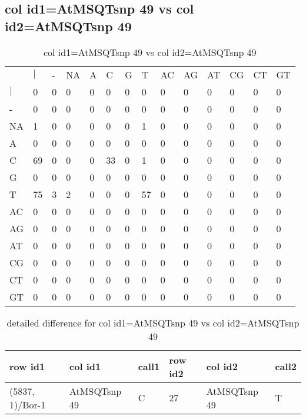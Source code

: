 \subsection{col id1=AtMSQTsnp 49 vs col id2=AtMSQTsnp 49}
\begin{center}
\begin{longtable}{|l|l|l|l|l|l|l|l|l|l|l|l|l|l|}
\caption{col id1=AtMSQTsnp 49 vs col id2=AtMSQTsnp 49} \label{table_dm738}\\
\hline
\\
\hline
&$|$&-&NA&A&C&G&T&AC&AG&AT&CG&CT&GT\\
$|$&0&0&0&0&0&0&0&0&0&0&0&0&0\\
-&0&0&0&0&0&0&0&0&0&0&0&0&0\\
NA&1&0&0&0&0&0&1&0&0&0&0&0&0\\
A&0&0&0&0&0&0&0&0&0&0&0&0&0\\
C&69&0&0&0&33&0&1&0&0&0&0&0&0\\
G&0&0&0&0&0&0&0&0&0&0&0&0&0\\
T&75&3&2&0&0&0&57&0&0&0&0&0&0\\
AC&0&0&0&0&0&0&0&0&0&0&0&0&0\\
AG&0&0&0&0&0&0&0&0&0&0&0&0&0\\
AT&0&0&0&0&0&0&0&0&0&0&0&0&0\\
CG&0&0&0&0&0&0&0&0&0&0&0&0&0\\
CT&0&0&0&0&0&0&0&0&0&0&0&0&0\\
GT&0&0&0&0&0&0&0&0&0&0&0&0&0\\
\hline
\end{longtable}
\end{center}

\begin{center}
\begin{longtable}{|l|l|l|l|l|l|}
\caption{detailed difference for col id1=AtMSQTsnp 49 vs col id2=AtMSQTsnp 49} \label{table_dm739}\\
\hline
row id1&col id1&call1&row id2&col id2&call2\\
\hline
(5837, 1)/Bor-1&AtMSQTsnp 49&C&27&AtMSQTsnp 49&T\\
\hline
\end{longtable}
\end{center}

